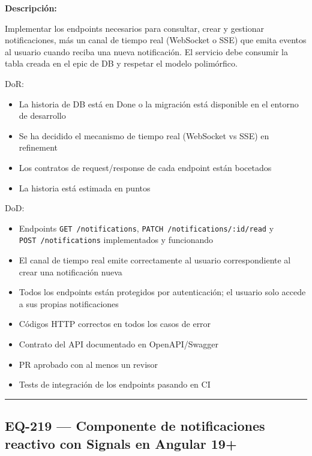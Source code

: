 \documentclass[
  spanish,
  11pt,
]{report}
\providecommand{\tightlist}{%
  \setlength{\itemsep}{0pt}\setlength{\parskip}{0pt}}
\begin{document}
\textbf{Descripción:}

Implementar los endpoints necesarios para consultar, crear y gestionar
notificaciones, más un canal de tiempo real (WebSocket o SSE) que emita
eventos al usuario cuando reciba una nueva notificación. El servicio
debe consumir la tabla creada en el epic de DB y respetar el modelo
polimórfico.

DoR:

\begin{itemize}
\tightlist
\item
  La historia de DB está en Done o la migración está disponible en el
  entorno de desarrollo
\item
  Se ha decidido el mecanismo de tiempo real (WebSocket vs SSE) en
  refinement
\item
  Los contratos de request/response de cada endpoint están bocetados
\item
  La historia está estimada en puntos
\end{itemize}

DoD:

\begin{itemize}
\tightlist
\item
  Endpoints \texttt{GET\ /notifications},
  \texttt{PATCH\ /notifications/:id/read} y
  \texttt{POST\ /notifications} implementados y funcionando
\item
  El canal de tiempo real emite correctamente al usuario correspondiente
  al crear una notificación nueva
\item
  Todos los endpoints están protegidos por autenticación; el usuario
  solo accede a sus propias notificaciones
\item
  Códigos HTTP correctos en todos los casos de error
\item
  Contrato del API documentado en OpenAPI/Swagger
\item
  PR aprobado con al menos un revisor
\item
  Tests de integración de los endpoints pasando en CI
\end{itemize}

\begin{center}\rule{0.5\linewidth}{0.5pt}\end{center}

\subsection{EQ-219 --- Componente de notificaciones reactivo con Signals
en Angular
19+}\label{eq-219-componente-de-notificaciones-reactivo-con-signals-en-angular-19}
\end{document}
